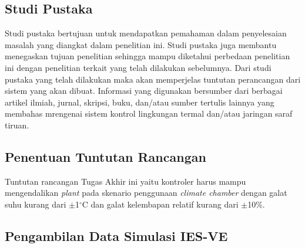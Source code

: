 

\subsection{Studi Pustaka}
Studi pustaka bertujuan untuk mendapatkan pemahaman dalam penyelesaian masalah yang diangkat dalam penelitian ini. Studi pustaka juga membantu menegaskan tujuan penelitian sehingga mampu diketahui perbedaan penelitian ini dengan penelitian terkait yang telah dilakukan sebelumnya. Dari studi pustaka yang telah dilakukan maka akan memperjelas tuntutan perancangan dari sistem yang akan dibuat. Informasi yang digunakan bersumber dari berbagai artikel ilmiah, jurnal, skripsi, buku, dan/atau sumber tertulis lainnya yang membahas mrengenai sistem kontrol lingkungan termal dan/atau jaringan saraf tiruan.

\subsection{Penentuan Tuntutan Rancangan}

Tuntutan rancangan Tugas Akhir ini yaitu kontroler harus mampu mengendalikan \textit{plant} pada skenario penggunaan \textit{climate chamber} dengan galat suhu kurang dari $\pm$1$^\circ$C dan galat kelembapan relatif kurang dari $\pm$10\%.

\subsection{Pengambilan Data Simulasi IES-VE}

